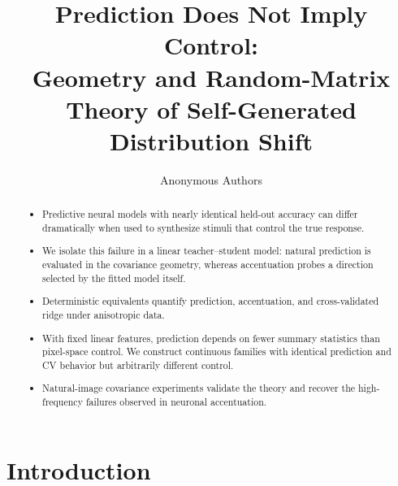 \documentclass{article}
\title{Prediction Does Not Imply Control:\\
Geometry and Random-Matrix Theory of Self-Generated Distribution Shift}
\author{Anonymous Authors}
\begin{document}
\maketitle

\begin{abstract}
\begin{itemize}[leftmargin=1.25em,itemsep=0pt,topsep=0pt]
  \item Predictive neural models with nearly identical held-out accuracy can
        differ dramatically when used to synthesize stimuli that control the
        true response.
  \item We isolate this failure in a linear teacher--student model: natural
        prediction is evaluated in the covariance geometry, whereas
        accentuation probes a direction selected by the fitted model itself.
  \item Deterministic equivalents quantify prediction, accentuation, and
        cross-validated ridge under anisotropic data.
  \item With fixed linear features, prediction depends on fewer summary
        statistics than pixel-space control. We construct continuous families
        with identical prediction and CV behavior but arbitrarily different
        control.
  \item Natural-image covariance experiments validate the theory and recover
        the high-frequency failures observed in neuronal accentuation.
\end{itemize}
\end{abstract}

\section{Introduction}
\end{document}
